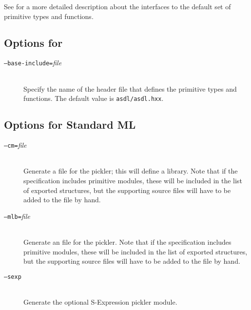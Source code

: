 See  for a more detailed description about the interfaces
to the default set of primitive types and functions.

\subsection*{Options for \Cplusplus}

\begin{description}
  \item[\normalfont\texttt{--base-include=}\textit{file}] \mbox{}\\
    Specify the name of the \Cplusplus{}header file that defines the primitive \asdl{} types
    and functions.
    The default value is \texttt{asdl/asdl.hxx}.
\end{description}%

\subsection*{Options for Standard ML}

\begin{description}
  \item[\normalfont\texttt{--cm=}\textit{file}] \mbox{}\\
    Generate a \cm{} file for the pickler; this will define a \cm{} library.
    Note that if the \asdl{} specification includes primitive modules, these
    will be included in the list of exported structures, but the supporting source
    files will have to be added to the \cm{} file by hand.
  \item[\normalfont\texttt{--mlb=}\textit{file}] \mbox{}\\
    Generate an \mlb{} file for the pickler.
    Note that if the \asdl{} specification includes primitive modules, these
    will be included in the list of exported structures, but the supporting source
    files will have to be added to the \mlb{} file by hand.
  \item[\normalfont\texttt{--sexp}] \mbox{}\\
    Generate the optional S-Expression pickler module.
\end{description}%

